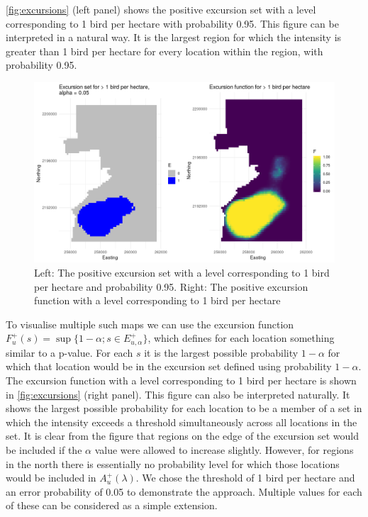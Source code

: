 \documentclass[preprint,12pt]{elsarticle}
\begin{document}
\autoref{fig:excursions} (left panel) shows the positive excursion set with a level corresponding to 1 bird per hectare with probability 0.95.  This figure can be interpreted in a natural way.  It is the largest region for which the intensity is greater than 1 bird per hectare for every location within the region, with probability 0.95.
\begin{figure}
	\includegraphics[scale=0.5]{figures/excursions.png}
	\caption{Left:  The positive excursion set with a level corresponding to 1 bird per hectare and probability 0.95.  Right: The positive excursion function with a level corresponding to 1 bird per hectare}
	\label{fig:excursions}
\end{figure}
To visualise multiple such maps we can use the excursion function $F_u^{+}(s) = \sup \{1 - \alpha ; s \in E_{u,\alpha}^+ \}$, which defines for each location something similar to a p-value.  For each $s$ it is the largest possible probability $1 -\alpha$ for which that location would be in the excursion set defined using probability $1 - \alpha$.  The excursion function with a level corresponding to 1 bird per hectare is shown in \autoref{fig:excursions} (right panel).  This figure can also be interpreted naturally.  It shows the largest possible probability for each location to be a member of a set in which the intensity exceeds a threshold simultaneously across all locations in the set. It is clear from the figure that regions on the edge of the excursion set would be included if the $\alpha$ value were allowed to increase slightly.  However, for regions in the north there is essentially no probability level for which those locations would be included in $A_u^{+}(\lambda)$.  
We chose the threshold of 1 bird per hectare and an error probability of 0.05 to demonstrate the approach.  Multiple values for each of these can be considered as a simple extension.
\end{document}
